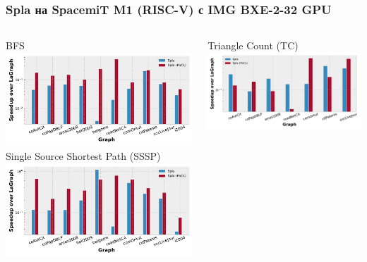 \documentclass[xcolor=table,aspectratio=169]{beamer}
\begin{document}
\begin{frame}
  \frametitle{Spla на SpacemiT M1 (RISC-V) с IMG BXE-2-32 GPU}

\begin{columns}
        \vspace{-0.5cm}
        \begin{center}
          BFS \\
        \includegraphics[width=0.909\linewidth]{pictures/rq1_rel_bfs.pdf}
        Single Source Shortest Path (SSSP) \\
        \includegraphics[width=0.909\linewidth]{pictures/rq1_rel_sssp.pdf}
        \end{center}
        \vspace{-0.5cm}
        \begin{center}
          Triangle Count (TC) \\
        \includegraphics[width=0.9\linewidth]{pictures/rq1_rel_tc.pdf}

\end{center}
\end{columns}
\end{frame}
\end{document}
